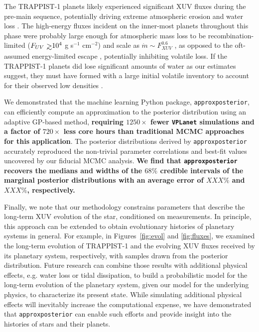 \documentclass[twocolumn]{aastex62}
\def\gsim{~\rlap{$>$}{\lower 1.0ex\hbox{$\sim$}}}
\newcommand{\xxx}[1]{{\textbf{#1}}}
\newcommand{\vplanet}[0]{\texttt{VPLanet}\xspace}
\newcommand{\approxposterior}[0]{\texttt{approxposterior}\xspace}
\begin{document}
The TRAPPIST-1 planets likely experienced significant XUV fluxes during the pre-main sequence, potentially driving extreme atmospheric erosion and water loss \citep{Bolmont2017,Bourrier2017a}. The high-energy fluxes incident on the inner-most planets throughout this phase were probably large enough for atmospheric mass loss to be recombination-limited ($F_{UV} \gsim 10^4$ g s$^{-1}$ cm$^{-2}$) and scale as $\dot{m} \sim F_{XUV}^{0.6}$ \citep{MurrayClay2009}, as opposed to the oft-assumed energy-limited escape \citep[$\dot{m} \sim F_{XUV}$,][]{Watson1981,Lammer2003}, potentially inhibiting volatile loss. If the TRAPPIST-1 planets did lose significant amounts of water as our estimates suggest, they must have formed with a large initial volatile inventory to account for their observed low densities \citep{Grimm2018}.

We demonstrated that the machine learning Python package, \approxposterior \citep{FlemingVanderPlas2018}, can efficiently compute an approximation to the posterior distribution using an adaptive GP-based method, \xxx{requiring $1250\times$ fewer \vplanet simulations and a factor of $720\times$ less core hours than traditional MCMC approaches for this application}. The posterior distributions derived by \approxposterior accurately reproduced the non-trivial parameter correlations and best-fit values uncovered by our fiducial MCMC analysis. \xxx{We find that \approxposterior recovers the medians and widths of the $68\%$ credible intervals of the marginal posterior distributions with an average error of $XXX\%$ and $XXX\%$, respectively.}  

Finally, we note that our methodology constrains parameters that describe the long-term XUV evolution of the star, conditioned on measurements. In principle, this approach can be extended to obtain evolutionary histories of planetary systems in general.  For example, in Figures~\ref{fig:evol} and \ref{fig:fluxes}, we examined the long-term evolution of TRAPPIST-1 and the evolving XUV fluxes received by its planetary system, respectively, with samples drawn from the posterior distribution. Future research can combine those results with additional physical effects, e.g. water loss or tidal dissipation, to build a probabilistic model for the long-term evolution of the planetary system, given our model for the underlying physics, to characterize its present state. While simulating additional physical effects will inevitably increase the computational expense, we have demonstrated that \approxposterior can enable such efforts and provide insight into the histories of stars and their planets.
\end{document}
